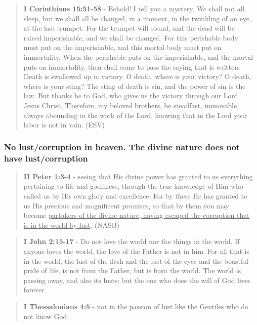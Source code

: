 \documentclass[11pt]{article}
\begin{document}
\begin{quote}
\textbf{I Corinthians 15:51-58} - Behold! I tell you a mystery. We shall not all sleep, but we shall all be changed, in a moment, in the twinkling of an eye, at the last trumpet. For the trumpet will sound, and the dead will be raised imperishable, and we shall be changed. For this perishable body must put on the imperishable, and this mortal body must put on immortality. When the perishable puts on the imperishable, and the mortal puts on immortality, then shall come to pass the saying that is written: Death is swallowed up in victory. O death, where is your victory? O death, where is your sting? The sting of death is sin, and the power of sin is the law. But thanks be to God, who gives us the victory through our Lord Jesus Christ. Therefore, my beloved brothers, be steadfast, immovable, always abounding in the work of the Lord, knowing that in the Lord your labor is not in vain. (ESV)
\end{quote}

\subsubsection{No lust/corruption in heaven. The divine nature does not have lust/corruption}
\label{sec:org8332fa1}
\begin{quote}
\textbf{II Peter 1:3-4} - seeing that His divine power has granted to us everything pertaining to life and godliness, through the true knowledge of Him who called us by His own glory and excellence. For by these He has granted to us His precious and magnificent promises, so that by them you may become \uline{partakers of the divine nature, having escaped the corruption that is in the world by lust}. (NASB)
\end{quote}

\begin{quote}
\textbf{I John 2:15-17} - Do not love the world nor the things in the world. If anyone loves the world, the love of the Father is not in him. For all that is in the world, the lust of the flesh and the lust of the eyes and the boastful pride of life, is not from the Father, but is from the world. The world is passing away, and also its lusts; but the one who does the will of God lives forever.
\end{quote}

\begin{quote}
\textbf{I Thessalonians 4:5} - not in the passion of lust like the Gentiles who do not know God;
\end{quote}
\end{document}
